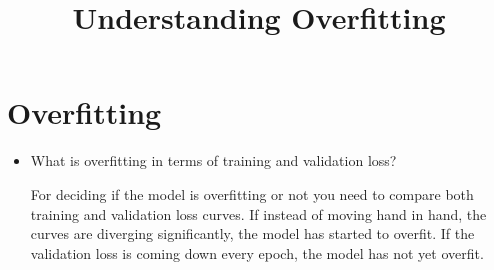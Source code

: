 \documentclass{../template/texnote}
\title{Understanding Overfitting}
\begin{document}
    \maketitle {}
	\section{Overfitting}
\begin{itemize}
	\item What is overfitting in terms of training and validation loss?
\par
For deciding if the model is overfitting or not you need to compare
both training and validation loss curves. If instead of moving hand in hand,
the curves are diverging significantly, the model has started to overfit.
If the validation loss is coming down every epoch, the model has not yet overfit.
\end{itemize}

    \printbibliography
\end{document}
